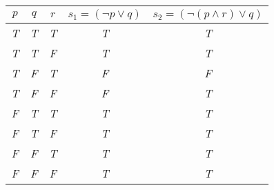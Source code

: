 
\begin{center}
\begin{tabular}{c c c ||c c}
 $p$ & $q$ & $r$ & $s_1=(\lnot p \lor q)$  & $s_2= (\lnot(p \land r) \lor q)$ \\
\hline
 \emph{T} & \emph{T} & \emph{T} 	& \emph{T} & \emph{T} \\
 \emph{T} & \emph{T} & \emph{F} 	& \emph{T} & \emph{T} \\
 \emph{T} & \emph{F} & \emph{T} 	& \emph{F} & \emph{F} \\
 \emph{T} & \emph{F} & \emph{F} 	& \emph{F} & \emph{T} \\
 \emph{F} & \emph{T} & \emph{T}	& \emph{T} & \emph{T} \\
 \emph{F} & \emph{T} & \emph{F}	& \emph{T} & \emph{T} \\
 \emph{F} & \emph{F} & \emph{T}	& \emph{T} & \emph{T} \\
 \emph{F} & \emph{F} & \emph{F}	& \emph{T} & \emph{T} \\

\end{tabular}
\end{center}

